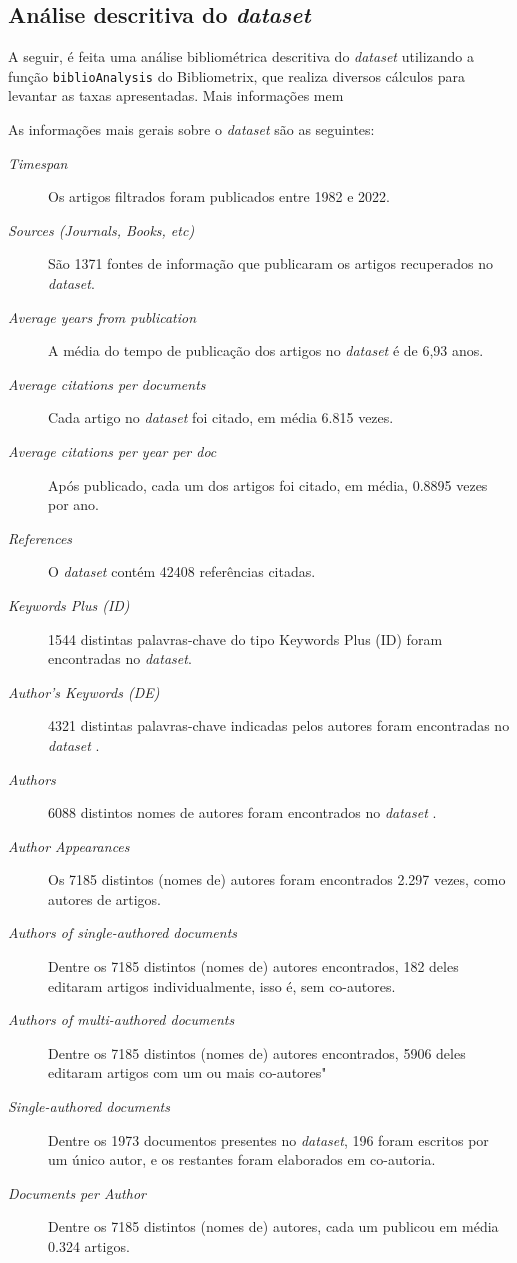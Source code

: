 \subsection{Análise descritiva do \textit{dataset} }

A seguir, é feita uma análise bibliométrica descritiva do \textit{dataset} utilizando a função \texttt{biblioAnalysis} do Bibliometrix, que realiza diversos cálculos para levantar as taxas apresentadas. Mais informações mem 

As informações mais gerais sobre o \textit{dataset} são as seguintes:
\begin{description}
    \item [\textit{Timespan}] Os artigos filtrados foram publicados entre 1982 e 2022.
    \item [\textit{Sources (Journals, Books, etc)}] São 1371 fontes de informação que publicaram os artigos recuperados no \textit{dataset}.
    \item [\textit{Average years from publication}] A média do tempo de publicação dos artigos no \textit{dataset} é de 6,93 anos.
    \item [\textit{Average citations per documents}] Cada artigo no \textit{dataset} foi citado, em média 6.815 vezes.
    \item [\textit{Average citations per year per doc}] Após publicado, cada um dos artigos foi citado, em média, 0.8895 vezes por ano.
    \item [\textit{References}] O \textit{dataset} contém 42408 referências citadas.
    \item [\textit{Keywords Plus (ID)}] 1544 distintas palavras-chave do tipo Keywords Plus (ID) foram encontradas no \textit{dataset}.
    \item [\textit{Author's Keywords (DE)}] 4321 distintas palavras-chave indicadas pelos autores foram encontradas no \textit{dataset} .
    \item [\textit{Authors}] 6088 distintos nomes de autores foram encontrados no \textit{dataset} .
    \item [\textit{Author Appearances}] Os 7185 distintos (nomes de) autores foram encontrados 2.297 vezes, como autores de artigos.
    \item [\textit{Authors of single-authored documents}] Dentre os 7185 distintos (nomes de) autores encontrados, 182 deles editaram artigos individualmente, isso é, sem co-autores.
    \item [\textit{Authors of multi-authored documents}] Dentre os 7185 distintos (nomes de) autores encontrados, 5906 deles editaram artigos com um ou mais co-autores"
    \item [\textit{Single-authored documents}] Dentre os 1973 documentos presentes no \textit{dataset}, 196 foram escritos por um único autor, e os restantes foram elaborados em co-autoria.
    \item [\textit{Documents per Author}] Dentre os 7185 distintos (nomes de) autores, cada um publicou em média 0.324 artigos.
\end{description}

